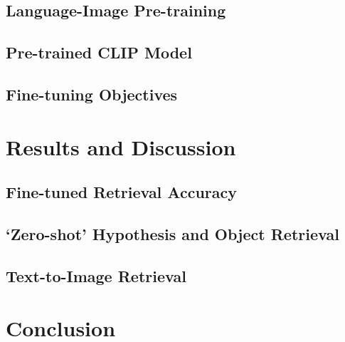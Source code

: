 \documentclass[10pt]{article} %
\newcommand{\datafolder}[1]{\def\thedatafolder{#1}}
\begin{document}
\subsection{Language-Image Pre-training}
\label{sec:pretraining}

\subsection{Pre-trained CLIP Model}
\label{sec:clip}

\subsection{Fine-tuning Objectives}
\label{sec:finetuning}

\section{Results and Discussion}
\label{sec:results}

\subsection{Fine-tuned Retrieval Accuracy}
\label{sec:retrieval_acc}

\subsection{`Zero-shot' Hypothesis and Object Retrieval}
\label{sec:zero_shot}

\subsection{Text-to-Image Retrieval}
\label{sec:tti}

\section{Conclusion}
\label{sec:conclusion}


\cite{Hinton06}



\datafolder{./plots/data/} %
\end{document}
